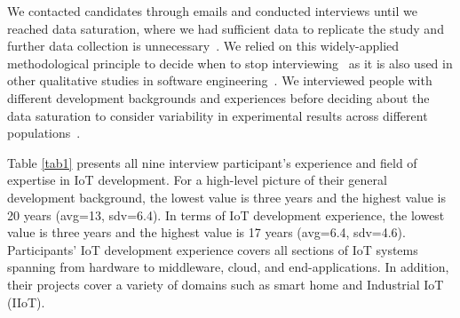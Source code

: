 We contacted candidates through emails and conducted interviews until we reached data saturation, where we had sufficient data to replicate the study and further data collection is unnecessary~\cite{dataSaturationFusch}. We relied on this widely-applied methodological principle to decide when to stop interviewing~\cite{saturationMorse,saturationGuest} as it is also used in other qualitative studies in software engineering~\cite{tweeter2014, aniche2018modern}. We interviewed people with different development backgrounds and experiences before deciding about the data saturation to consider variability in experimental results across different populations~\cite{henrich2010weirdest}. 


 Table \ref{tab1} presents all nine interview participant's experience and field of expertise in IoT development. For a high-level picture of their general development background, the lowest value is three years and the highest value is 20 years (avg=13, sdv=6.4). In terms of IoT development experience, the lowest value is three years and the highest value is 17 years (avg=6.4, sdv=4.6). Participants' IoT development experience covers all sections of IoT systems spanning from hardware to middleware, cloud, and end-applications. In addition, their projects cover a variety of domains such as smart home and Industrial IoT (IIoT). 


